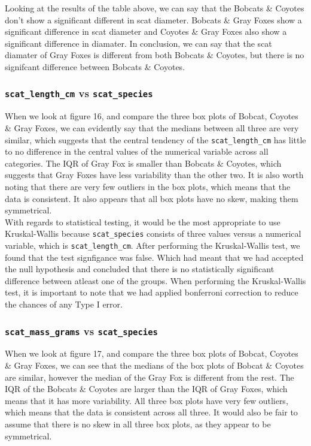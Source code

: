 \documentclass[a4paper]{article}
\begin{document}
\noindent Looking at the results of the table above, we can say that the Bobcats \& Coyotes don't show a significant different in scat diameter. Bobcats 
\& Gray Foxes show a significant difference in scat diameter and Coyotes \& Gray Foxes also show a significant difference in diamater. In conclusion, we can
say that the scat diamater of Gray Foxes is different from both Bobcats \& Coyotes, but there is no signifcant difference between Bobcats \& Coyotes. \\

\subsubsection{\texttt{scat\_length\_cm} vs \texttt{scat\_species}}
When we look at figure 16, and compare the three box plots of Bobcat, Coyotes \& Gray Foxes, we can evidently say that the medians between all three are very 
similar, which suggests that the central tendency of the \texttt{scat\_length\_cm} has little to no difference in the central values of the numerical variable
across all categories. The IQR of Gray Fox is smaller than Bobcats \& Coyotes, which suggests that Gray Foxes have less variability than the other two. It is
also worth noting that there are very few outliers in the box plots, which means that the data is consistent. It also appears that all box plots have no skew,
making them symmetrical. \\

\noindent With regards to statistical testing, it would be the most appropriate to use Kruskal-Wallis because \texttt{scat\_species} consists of three values
versus a numerical variable, which is \texttt{scat\_length\_cm}. After performing the Kruskal-Wallis test, we found that the test signfigance was false. Which
had meant that we had accepted the null hypothesis and concluded that there is no statistically significant difference between atleast one of the groups. 
When performing the Kruskal-Wallis test, it is important to note that we had applied bonferroni correction to reduce the chances of any Type I error. \\

\subsubsection{\texttt{scat\_mass\_grams} vs \texttt{scat\_species}}
When we look at figure 17, and compare the three box plots of Bobcat, Coyotes \& Gray Foxes, we can see that the medians of the box plots of Bobcat \&
Coyotes are similar, however the median of the Gray Fox is different from the rest. The IQR of the Bobcats \& Coyotes are larger than the IQR of Gray Foxes,
which means that it has more variability. All three box plots have very few outliers, which means that the data is consistent across all three. It would also
be fair to assume that there is no skew in all three box plots, as they appear to be symmetrical. \\
\end{document}
